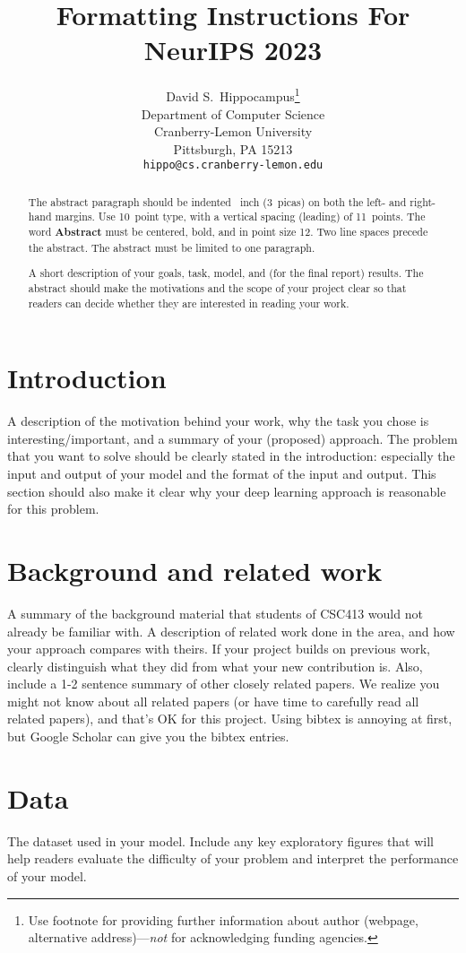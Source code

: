 \documentclass{article}
\title{Formatting Instructions For NeurIPS 2023}
\author{%
  David S.~Hippocampus\thanks{Use footnote for providing further information
    about author (webpage, alternative address)---\emph{not} for acknowledging
    funding agencies.} \\
  Department of Computer Science\\
  Cranberry-Lemon University\\
  Pittsburgh, PA 15213 \\
  \texttt{hippo@cs.cranberry-lemon.edu} \\
}
\begin{document}
\maketitle


\begin{abstract}
  The abstract paragraph should be indented ~inch (3~picas) on
  both the left- and right-hand margins. Use 10~point type, with a vertical
  spacing (leading) of 11~points.  The word \textbf{Abstract} must be centered,
  bold, and in point size 12. Two line spaces precede the abstract. The abstract
  must be limited to one paragraph.

  A short description of your goals, task, model, and (for
the final report) results. The abstract should make the
motivations and the scope of your project clear so that
readers can decide whether they are interested in
reading your work.
\end{abstract}


\section{Introduction}

A description of the motivation behind your work, why
the task you chose is interesting/important, and a
summary of your (proposed) approach. The problem
that you want to solve should be clearly stated in the
introduction: especially the input and output of your
model and the format of the input and output. This
section should also make it clear why your deep
learning approach is reasonable for this problem.

\section{Background and related work}

A summary of the background material that students of
CSC413 would not already be familiar with. A
description of related work done in the area, and how
your approach compares with theirs.
If your project builds on previous work, clearly
distinguish what they did from what your new
contribution is. Also, include a 1-2 sentence summary
of other closely related papers. We realize you might
not know about all related papers (or have time to
carefully read all related papers), and that's OK for this
project. Using bibtex is annoying at first, but Google
Scholar can give you the bibtex entries.

\section{Data}
The dataset used in your model. Include any key
exploratory figures that will help readers evaluate the
difficulty of your problem and interpret the performance
of your model.
\end{document}

